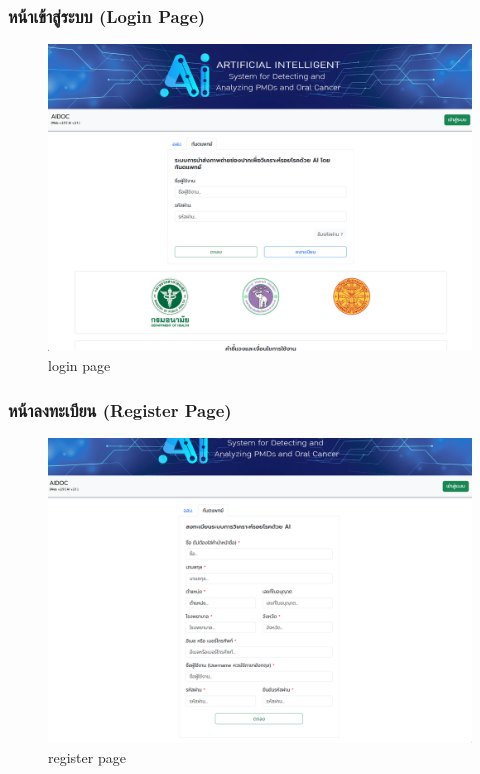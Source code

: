 \subsubsection{หน้าเข้าสู่ระบบ (Login Page)}
\begin{figure}[H]
    \centering
    \includegraphics[scale=0.3]{images/login_dent.png}
    \caption{login page}
    \label{fig:login_user}
  \end{figure}

\subsubsection{หน้าลงทะเบียน (Register Page)}

\begin{figure}[H]
    \centering
    \includegraphics[scale=0.3]{images/register_user.png}
    \caption{register page}
    \label{fig:register_user}
  \end{figure}
